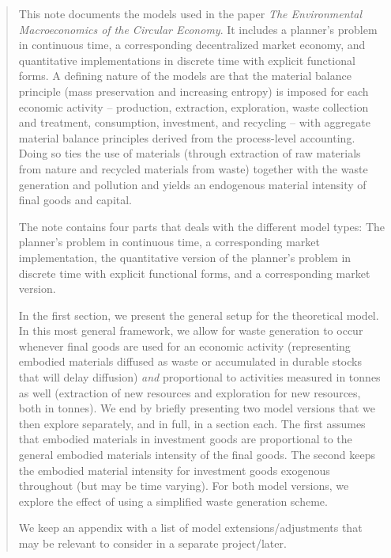 ﻿\begin{abstract}
\noindent
This note documents the models used in the paper  \emph{The Environmental Macroeconomics of the Circular Economy}. It includes a planner's problem in continuous time, a corresponding decentralized market economy, and quantitative implementations in discrete time with explicit functional forms. A defining nature of the models are that the material balance principle (mass preservation and increasing entropy) is imposed for each economic activity -- production, extraction, exploration, waste collection and treatment, consumption, investment, and recycling -- with aggregate material balance principles derived from the process-level accounting. Doing so ties the use of materials (through extraction of raw materials from nature and recycled materials from waste) together with the waste generation and pollution and yields an endogenous material intensity of final goods and capital. 

The note contains four parts that deals with the different model types: The planner's problem in continuous time, a corresponding market implementation, the quantitative version of the planner's problem in discrete time with explicit functional forms, and a corresponding market version. 

In the first section, we present the general setup for the theoretical model. In this most general framework, we allow for waste generation to occur whenever final goods are used for an economic activity (representing embodied materials diffused as waste or accumulated in durable stocks that will delay diffusion) \emph{and} proportional to activities measured in tonnes as well (extraction of new resources and exploration for new resources, both in tonnes). We end by briefly presenting two model versions that we then explore separately, and in full, in a section each. The first assumes that embodied materials in investment goods are proportional to the general embodied materials intensity of the final goods. The second keeps the embodied material intensity for investment goods exogenous throughout (but may be time varying). For both model versions, we explore the effect of using a simplified waste generation scheme.

We keep an appendix with a list of model extensions/adjustments that may be relevant to consider in a separate project/later. 
\end{abstract}